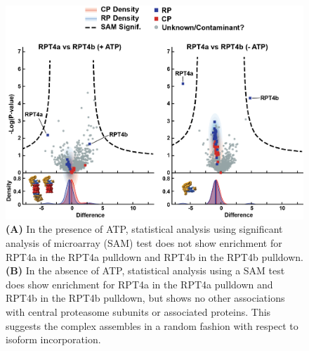 \begin{figure}[ht]
	\centering
	\includegraphics[width=\columnwidth]{Proteasome/supprpt4avsrpt4b.png}
	{\textbf{(A)} In the presence of ATP, statistical analysis using significant analysis of microarray (SAM) test does not show enrichment for RPT4a in the RPT4a pulldown and RPT4b in the RPT4b pulldown. \textbf{(B)} In the absence of ATP, statistical analysis using a SAM test does show enrichment for RPT4a in the RPT4a pulldown and RPT4b in the RPT4b pulldown, but shows no other associations with central proteasome subunits or associated proteins. This suggests the complex assembles in a random fashion with respect to isoform incorporation.}
	\label{fig:suprpt4avsrpt4b}
\end{figure}




